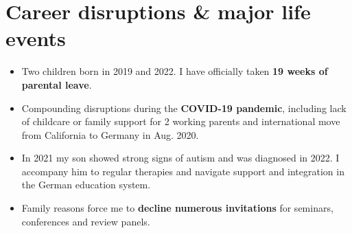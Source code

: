 \documentclass[11pt,a4paper]{article}
\newcounter{num}
\begin{document}
\section*{Career disruptions \& major life events}
\begin{itemize}\setlength{\itemsep}{1pt}
\item Two children born in 2019 and 2022. I have officially taken \textbf{19 weeks of parental leave}. %
\item Compounding disruptions during the \textbf{COVID-19 pandemic}, including lack of childcare or family support for 2 working parents and international move from California to Germany in Aug. 2020. 
\item In 2021 my son showed strong signs of autism and was diagnosed in 2022. I accompany him to regular therapies and navigate support and integration in the German education system.
\item Family reasons force me to \textbf{decline numerous invitations} for seminars, conferences and review panels. %
\end{itemize}


\end{document}
